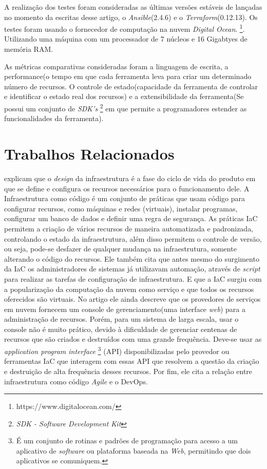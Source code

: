A realização dos testes foram consideradas as últimas versões estáveis de lançadas no momento da escritas desse artigo, o \textit{Ansible}(2.4.6) e o \textit{Terraform}(0.12.13). Os testes foram usando o fornecedor de computação na nuvem  \textit{Digital Ocean}. \footnote{https://www.digitalocean.com/}. Utilizando uma máquina com um processador de 7 núcleos e 16 Gigabtyes de memória RAM.   

As métricas comparativas consideradas foram a linguagem de escrita, a performance(o tempo em que cada ferramenta leva para criar um determinado número de recursos. O controle de estado(capacidade da ferramenta  de controlar e identificar o estado real dos recursos) e a extensibilidade da ferramenta(Se possui um conjunto de \textit{SDK's} \footnote{\textit{SDK - Software Development Kit}} em que permite a programadores estender as funcionalidades da ferramenta).  


\section{\esp Trabalhos Relacionados} \label{relacionados}


 explicam que o \textit{design} da infraestrutura é a fase do ciclo de vida do produto em que se define e configura os recursos necessários para o funcionamento dele. A Infraestrutura como código é um conjunto de práticas que usam código para configurar recursos, como máquinas e redes (virtuais), instalar programas, configurar um banco de dados e definir uma regra de segurança. As práticas IaC permitem a criação de vários recursos de maneira automatizada e padronizada, controlando o estado da infraestrutura, além disso permitem o controle de versão, ou seja, pode-se desfazer de qualquer mudança na infraestrutura, somente alterando o código do recursos. Ele também cita que antes mesmo do surgimento da IaC os administradores de sistemas já utilizavam automação, através de \textit{script} para realizar as tarefas de configuração de infraestrutura. E que a IaC surgiu com a popularização da computação da nuvem como serviço e que todos os recursos oferecidos são virtuais. No artigo ele ainda descreve que os provedores de serviços em nuvem fornecem um console de gerenciamento(uma interface \textit{web}) para a administração de recursos. Porém, para um sistema de larga escala, usar o console não é muito prático, devido à dificuldade de gerenciar centenas de recursos que são criados e destruídos com uma grande frequência. Deve-se usar as \textit{application program interface} \footnote{É um conjunto de rotinas e padrões de programação para acesso a um aplicativo de \textit{software} ou plataforma baseada na \textit{Web}, permitindo que dois aplicativos se comuniquem. } (API) disponibilizadas pelo provedor ou ferramentas IaC que interagem com essas API que resolvem a questão da criação e destruição de alta frequência desses recursos. Por fim, ele cita a relação entre infraestrutura como código \textit{Agile} e o DevOps. 

